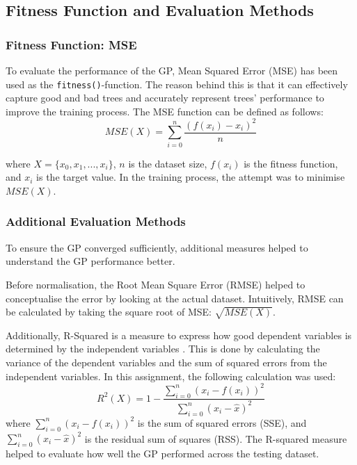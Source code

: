 \documentclass{article}
\begin{document}
\subsection{Fitness Function and Evaluation Methods}
\subsubsection{Fitness Function: MSE}
To evaluate the performance of the GP, Mean Squared Error (MSE) has been used as the \texttt{fitness()}-function. The reason behind this is that it can effectively capture good and bad trees and accurately represent trees' performance to improve the training process. The MSE function can be defined as follows:
\begin{equation}\label{mse}
  MSE(X) = \sum_{i=0}^{n} \frac{(f(x_i) - x_i)^2}{n}
\end{equation}

where \(X = \{x_0, x_1, ... , x_i\}\), \(n\) is the dataset size, \(f(x_i)\) is the fitness function, and \(x_i\) is the target value. In the training process, the attempt was to minimise \(MSE(X)\).
\subsubsection{Additional Evaluation Methods}
To ensure the GP converged sufficiently, additional measures helped to understand the GP performance better.

Before normalisation, the Root Mean Square Error (RMSE) helped to conceptualise the error by looking at the actual dataset. Intuitively, RMSE can be calculated by taking the square root of MSE: \(\sqrt{MSE(X)}\).

Additionally, R-Squared is a measure to express how good dependent variables is determined by the independent variables \cite{fernando_2024_rsquared}. This is done by calculating the variance of the dependent variables and the sum of squared errors from the independent variables. In this assignment, the following calculation was used:
\begin{equation}\label{norm}
  R^2(X) = 1 - \frac{\sum_{i=0}^{n} (x_i-f(x_i))^2}{\sum_{i=0}^{n} (x_i-\hat{x})^2}
\end{equation}
where \(\sum_{i=0}^{n} (x_i-f(x_i))^2\) is the sum of squared errors (SSE), and \(\sum_{i=0}^{n} (x_i-\hat{x})^2\) is the residual sum of squares (RSS). The R-squared measure helped to evaluate how well the GP performed across the testing dataset.
\end{document}
